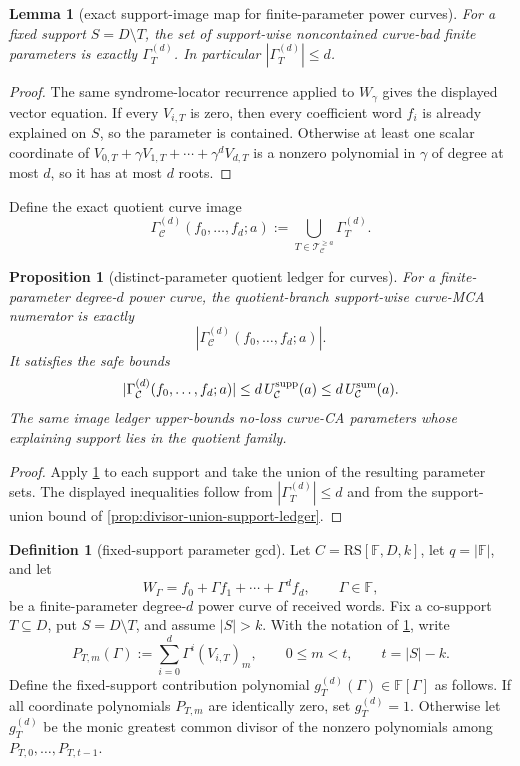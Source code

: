 \documentclass[11pt]{article}
\newtheorem{lemma}[lemma]{Lemma}
\newtheorem{proposition}[proposition]{Proposition}
\theoremstyle{definition}
\newtheorem{definition}[definition]{Definition}
\theoremstyle{remark}
\newcommand{\F}{\mathbb{F}}
\newcommand{\RS}{\mathrm{RS}}
\begin{document}
\begin{lemma}[exact support-image map for finite-parameter power curves]
\label{lem:exact-curve-image-map}
For a fixed support $S=D\setminus T$, the set of support-wise noncontained
curve-bad finite parameters is exactly $\Gamma_T^{(d)}$.  In particular
$|\Gamma_T^{(d)}|\le d$.
\end{lemma}

\begin{proof}
The same syndrome-locator recurrence applied to $W_\gamma$ gives the displayed
vector equation.  If every $V_{i,T}$ is zero, then every coefficient word
$f_i$ is already explained on $S$, so the parameter is contained.  Otherwise at
least one scalar coordinate of
$V_{0,T}+\gamma V_{1,T}+\cdots+\gamma^dV_{d,T}$ is a nonzero polynomial in
$\gamma$ of degree at most $d$, so it has at most $d$ roots.
\end{proof}

Define the exact quotient curve image
\[
        \Gamma_{\mathcal C}^{(d)}(f_0,\ldots,f_d;a)
        :=\bigcup_{T\in\mathcal T_{\mathcal C}^{\ge a}}\Gamma_T^{(d)} .
\]

\begin{proposition}[distinct-parameter quotient ledger for curves]
\label{prop:distinct-parameter-curve-ledger}
For a finite-parameter degree-$d$ power curve, the quotient-branch support-wise
curve-MCA numerator is exactly
\[
        |\Gamma_{\mathcal C}^{(d)}(f_0,
        \ldots,f_d;a)| .
\]
It satisfies the safe bounds
\[
        |\Gamma_{\mathcal C}^{(d)}(f_0,\ldots,f_d;a)|
        \le d\,U_{\mathcal C}^{\rm supp}(a)
        \le d\,U_{\mathcal C}^{\rm sum}(a).
\]
The same image ledger upper-bounds no-loss curve-CA parameters whose explaining
support lies in the quotient family.
\end{proposition}

\begin{proof}
Apply \cref{lem:exact-curve-image-map} to each support and take the union of the
resulting parameter sets.  The displayed inequalities follow from
$|\Gamma_T^{(d)}|\le d$ and from the support-union bound of
\cref{prop:divisor-union-support-ledger}.
\end{proof}

\begin{definition}[fixed-support parameter gcd]
\label{def:fixed-support-parameter-gcd}
Let $C=\RS[\F,D,k]$, let $q=|\F|$, and let
\[
        W_\Gamma=f_0+\Gamma f_1+\cdots+\Gamma^d f_d,
        \qquad \Gamma\in\F,
\]
be a finite-parameter degree-$d$ power curve of received words.  Fix a
co-support $T\subseteq D$, put $S=D\setminus T$, and assume
$|S|>k$.  With the notation of \cref{lem:exact-curve-image-map}, write
\[
        P_{T,m}(\Gamma)
        :=\sum_{i=0}^d \Gamma^i (V_{i,T})_m,
        \qquad 0\le m<t,
        \qquad t=|S|-k .
\]
Define the fixed-support contribution polynomial
$g_T^{(d)}(\Gamma)\in\F[\Gamma]$ as follows.  If all coordinate polynomials
$P_{T,m}$ are identically zero, set $g_T^{(d)}=1$.  Otherwise let
$g_T^{(d)}$ be the monic greatest common divisor of the nonzero polynomials
among $P_{T,0},\ldots,P_{T,t-1}$.
\end{definition}
\end{document}
